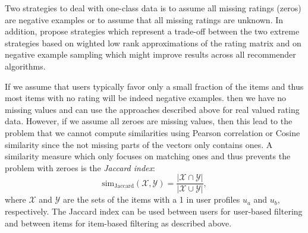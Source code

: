 \documentclass[nojss]{jss}
\newcommand{\set}[1]{\mathcal{#1}}
\begin{document}
Two strategies to deal with one-class data is to assume all missing ratings 
(zeros) are negative examples or to assume that all missing ratings are unknown.
In addition,
\cite{recommender:Pan:2008} propose strategies which represent a
trade-off between the two extreme strategies based on wighted low rank
approximations of the rating matrix and on negative example sampling which
might improve results across all recommender algorithms. 

If we assume that users  typically favor only a small fraction of the items and thus most items with no rating will be indeed negative examples. 
then we have no missing values and can use the approaches 
described above for real valued rating data. However,
if we assume all zeroes are missing values, then this lead
to the problem that we cannot compute similarities using
Pearson correlation or Cosine similarity since the
not missing parts of the vectors only contains ones.
A similarity measure which
only focuses on matching ones 
and thus prevents the problem with zeroes
is the \emph{Jaccard index}:
\begin{equation}
\mathrm{sim_{Jaccard}}(\set{X},\set{Y}) = \frac{|\set{X}\cap \set{Y}|}
{|\set{X}\cup \set{Y}|},
\end{equation}
where
$\set{X}$ and $\set{Y}$ are the sets of the items with a 1 in user profiles
$u_a$ and $u_b$, respectively.
The Jaccard index can be used between users for user-based filtering
and between items for item-based filtering as described above.

\end{document}
